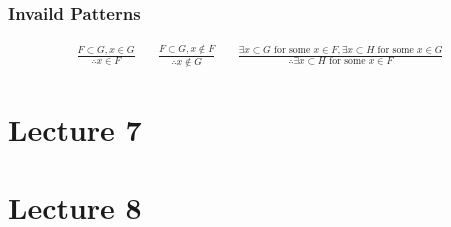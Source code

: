 \documentclass{article}
\begin{document}
\subsubsection{Invaild Patterns}
\begin{align*}
\frac{F \subset G, x \in G}{\therefore x \in F} &&
\frac{F \subset G, x \not\in F}{\therefore x \not\in G} &&
\frac{\exists x \subset G \text{ for some } x \in F, \exists x \subset H \text{ for some } x \in G}{\therefore \exists x \subset H \text{ for some } x \in F}
\end{align*}

\section{Lecture 7}

\section{Lecture 8}
\end{document}
